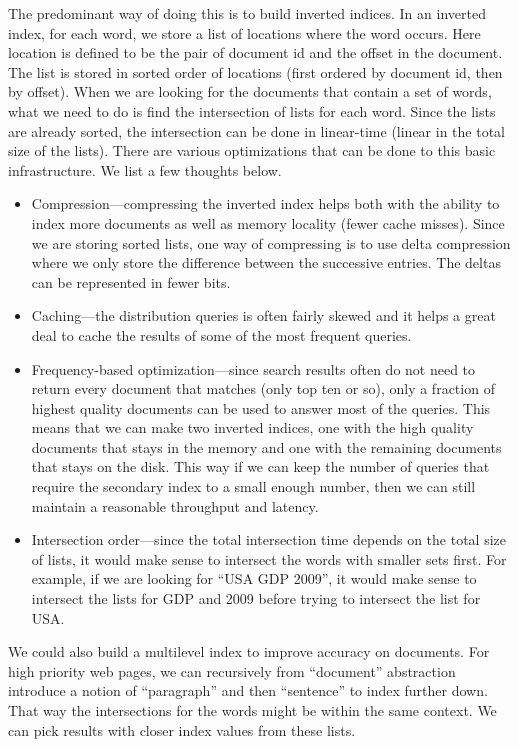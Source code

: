 The predominant way of doing this is to build inverted indices. In an inverted index, for each word, we store a list of locations where the word
occurs. Here location is defined to be the pair of document id and the
offset in the document.  The list is stored in sorted order of
locations (first ordered by document id, then by offset). When we are
looking for the documents that contain a set of words, what we need to
do is find the intersection of lists for each word. Since the lists
are already sorted, the intersection can be done in linear-time (linear in 
the total size of the lists). There are various optimizations that
can be done to this basic infrastructure. We list a few thoughts below.
\begin {itemize}
\itemsep 1pt
\item \textrm{Compression}---compressing the inverted index
  helps both with the ability to index more documents as well as memory
  locality (fewer cache misses). Since we are storing sorted lists,
  one way of compressing is to use delta compression where we only
  store the difference between the successive entries. The deltas can be
  represented in fewer bits.  
\item \textrm{Caching}---the distribution queries is often fairly skewed
  and it helps a great deal to cache the results of some of the most
  frequent queries.
\item \textrm{Frequency-based optimization}---since search results often
  do not need to return every document that matches (only top ten or
  so), only a fraction of highest quality documents can be used to
  answer most of the queries. This means that we can make two
  inverted indices, one with the high quality documents that stays in the
  memory and one with the remaining documents that stays on the disk. This
  way if we can keep the number of queries that require the secondary
   index to a small enough number, then we can still maintain a reasonable throughput
  and latency.
\item \textrm{Intersection order}---since the total intersection time
  depends on the total size of lists, it would make sense to intersect the words with smaller sets first. For example, if we are looking for
  ``USA GDP 2009'', it would make sense to intersect the lists for GDP and 2009
  before trying to intersect the list for USA.
\end{itemize}
We could also build a multilevel index 
to improve accuracy on documents. For high priority web pages, we can
recursively from ``document'' abstraction introduce a notion of ``paragraph'' 
and then ``sentence'' to index further down. That way 
the intersections for the words might be within the 
same context. We can pick results with closer
index values from these lists.



